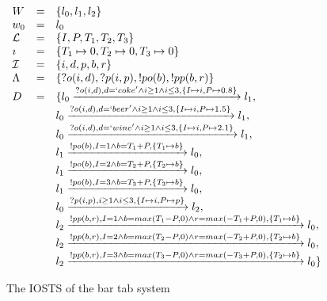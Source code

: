   \begin{figure}[ht]
    \begin{center}
      $\begin{array}{lcl}
      W & = & \{l_0, l_1, l_2\} \\
      w_0 & = & l_0 \\
      \mathcal{L} & = & \{I, P, T_1, T_2, T_3\} \\
      \imath & = & \{T_1 \mapsto 0, T_2 \mapsto 0, T_3 \mapsto 0\} \\
      \mathcal{I} & = & \{i, d, p, b, r\} \\
      \Lambda & = & \{?o(i,d), ?p(i,p), !po(b), !pp(b, r)\} \\
      D & = & \{l_0\xrightarrow{?o(i,d), d=`coke' \land i \geq 1 \land i \leq 3, \{I \mapsto i, P \mapsto 0.8\}}l_1, \\
      & & l_0\xrightarrow{?o(i,d), d=`beer' \land i \geq 1 \land i \leq 3, \{I \mapsto i, P \mapsto 1.5\}}l_1,\\
      & & l_0\xrightarrow{?o(i,d), d=`wine' \land i \geq 1 \land i \leq 3, \{I \mapsto i, P \mapsto 2.1\}}l_1,\\
      & & l_1\xrightarrow{!po(b), I=1\land b=T_1+P, \{T_1 \mapsto b\}}l_0,\\
      & & l_1\xrightarrow{!po(b), I=2\land b=T_2+P, \{T_2 \mapsto b\}}l_0,\\
      & & l_1\xrightarrow{!po(b), I=3\land b=T_3+P, \{T_3 \mapsto b\}}l_0,\\
      & & l_0\xrightarrow{?p(i,p), i \geq 1 \land i \leq 3, \{I \mapsto i, P \mapsto p\}}l_2,\\
      & & l_2\xrightarrow{!pp(b,r),I=1\land b=max(T_1-P, 0)\land r=max(-T_1+P,0),\{T_1 \mapsto b\}}l_0,\\
      & & l_2\xrightarrow{!pp(b,r),I=2\land b=max(T_2-P, 0)\land r=max(-T_2+P,0),\{T_2 \mapsto b\}}l_0, \\
      & & l_2\xrightarrow{!pp(b,r),I=3\land b=max(T_3-P, 0)\land r=max(-T_3+P,0),\{T_2 \mapsto b\}}l_0\}
      \end{array}$
    \end{center}
    \caption{The IOSTS of the bar tab system}
    \label{fig:sts-bartab}
  \end{figure}

